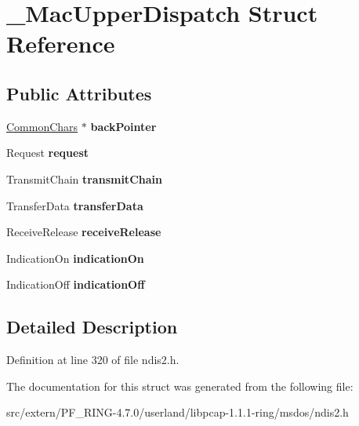 \hypertarget{struct___mac_upper_dispatch}{
\section{\_\-MacUpperDispatch Struct Reference}
\label{struct___mac_upper_dispatch}
}
\subsection*{Public Attributes}
\begin{DoxyCompactItemize}
\item 
\hypertarget{struct___mac_upper_dispatch_aa48f3c8d183c42327de26b3ab9193d84}{
\hyperlink{struct___common_chars}{CommonChars} $\ast$ {\bfseries backPointer}}
\label{struct___mac_upper_dispatch_aa48f3c8d183c42327de26b3ab9193d84}

\item 
\hypertarget{struct___mac_upper_dispatch_a1e59e8b16d881633d2076f7de8cbade4}{
Request {\bfseries request}}
\label{struct___mac_upper_dispatch_a1e59e8b16d881633d2076f7de8cbade4}

\item 
\hypertarget{struct___mac_upper_dispatch_ac27f812c9de70d6a2b89a81b4d449a71}{
TransmitChain {\bfseries transmitChain}}
\label{struct___mac_upper_dispatch_ac27f812c9de70d6a2b89a81b4d449a71}

\item 
\hypertarget{struct___mac_upper_dispatch_ae1e46f72236233581886b7c01d7113b5}{
TransferData {\bfseries transferData}}
\label{struct___mac_upper_dispatch_ae1e46f72236233581886b7c01d7113b5}

\item 
\hypertarget{struct___mac_upper_dispatch_aac81bc7f8602e03e2d5438556c1122cc}{
ReceiveRelease {\bfseries receiveRelease}}
\label{struct___mac_upper_dispatch_aac81bc7f8602e03e2d5438556c1122cc}

\item 
\hypertarget{struct___mac_upper_dispatch_aa92b9bfd60e0e7547a0b3105f440a8a3}{
IndicationOn {\bfseries indicationOn}}
\label{struct___mac_upper_dispatch_aa92b9bfd60e0e7547a0b3105f440a8a3}

\item 
\hypertarget{struct___mac_upper_dispatch_a6f2c4c847315e39689a958692b9b9e3f}{
IndicationOff {\bfseries indicationOff}}
\label{struct___mac_upper_dispatch_a6f2c4c847315e39689a958692b9b9e3f}

\end{DoxyCompactItemize}


\subsection{Detailed Description}


Definition at line 320 of file ndis2.h.



The documentation for this struct was generated from the following file:\begin{DoxyCompactItemize}
\item 
src/extern/PF\_\-RING-\/4.7.0/userland/libpcap-\/1.1.1-\/ring/msdos/ndis2.h\end{DoxyCompactItemize}
